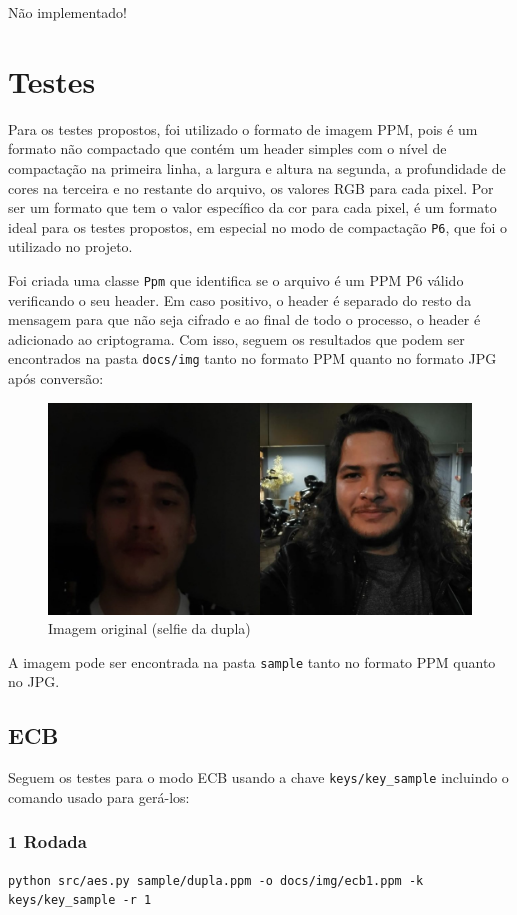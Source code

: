 \documentclass[12pt]{article}
\begin{document}
Não implementado!

\section{Testes}
Para os testes propostos, foi utilizado o formato de imagem PPM, pois é um formato não compactado que contém um header simples com o nível de compactação na primeira linha, a largura e altura na segunda, a profundidade de cores na terceira e no restante do arquivo, os valores RGB para cada pixel. Por ser um formato que tem o valor específico da cor para cada pixel, é um formato ideal para os testes propostos, em especial no modo de compactação \texttt{P6}, que foi o utilizado no projeto.

Foi criada uma classe \texttt{Ppm} que identifica se o arquivo é um PPM P6 válido verificando o seu header. Em caso positivo, o header é separado do resto da mensagem para que não seja cifrado e ao final de todo o processo, o header é adicionado ao criptograma. Com isso, seguem os resultados que podem ser encontrados na pasta \texttt{docs/img} tanto no formato PPM quanto no formato JPG após conversão:

\begin{figure}[H]
	\centering
    \includegraphics[width=.5\textwidth]{../sample/dupla.jpg}
    \caption{Imagem original (selfie da dupla)}
\end{figure}

A imagem pode ser encontrada na pasta \texttt{sample} tanto no formato PPM quanto no JPG.

\subsection{ECB}

Seguem os testes para o modo ECB usando a chave \texttt{keys/key\_sample} incluindo o comando usado para gerá-los:

\subsubsection{1 Rodada}

\texttt{python src/aes.py sample/dupla.ppm -o docs/img/ecb1.ppm -k keys/key\_sample -r 1}
\end{document}
